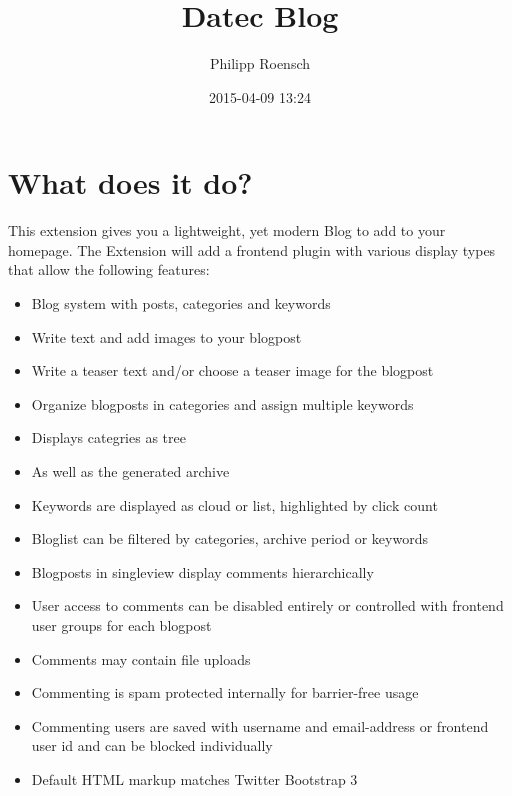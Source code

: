 \documentclass[a4paper,10pt,english]{sphinxmanual}
\title{Datec Blog}
\date{2015-04-09 13:24}
\author{Philipp Roensch}
\begin{document}
\maketitle
\tableofcontents
{}\label{Index::doc}



\chapter{What does it do?}
\label{Introduction/Index:introduction}\label{Introduction/Index:what-does-it-do}\label{Introduction/Index:start}\label{Introduction/Index:datec-blog}\label{Introduction/Index::doc}
This extension gives you a lightweight, yet modern Blog to add to your homepage.
The Extension will add a frontend plugin with various display types that allow the following features:
\begin{itemize}
\item {} 
Blog system with posts, categories and keywords

\item {} 
Write text and add images to your blogpost

\item {} 
Write a teaser text and/or choose a teaser image for the blogpost

\item {} 
Organize blogposts in categories and assign multiple keywords

\item {} 
Displays categries as tree

\item {} 
As well as the generated archive

\item {} 
Keywords are displayed as cloud or list, highlighted by click count

\item {} 
Bloglist can be filtered by categories, archive period or keywords

\item {} 
Blogposts in singleview display comments hierarchically

\item {} 
User access to comments can be disabled entirely or controlled with frontend user groups for each blogpost

\item {} 
Comments may contain file uploads

\item {} 
Commenting is spam protected internally for barrier-free usage

\item {} 
Commenting users are saved with username and email-address or frontend user id and can be blocked individually

\item {} 
Default HTML markup matches Twitter Bootstrap 3

\end{itemize}
\end{document}
